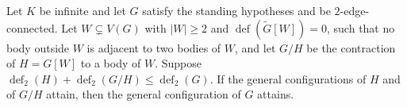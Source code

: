 \begin{theorem}
  \label{thm:pencil-x0-contract-additive}
  \leanok
  Let $K$ be infinite and let $G$ satisfy the standing hypotheses and be
  $2$-edge-connected. Let $W \subsetneq V(G)$ with $|W| \ge 2$ and
  $\operatorname{def}(\tilde G[W]) = 0$, such that no body outside $W$ is
  adjacent to two bodies of $W$, and let $G/H$ be the contraction of
  $H = G[W]$ to a body of $W$. Suppose
  $\operatorname{def}_2(H) + \operatorname{def}_2(G/H) \le
  \operatorname{def}_2(G)$. If the general configurations of $H$ and of
  $G/H$ attain, then the general configuration of $G$ attains.
\end{theorem}

